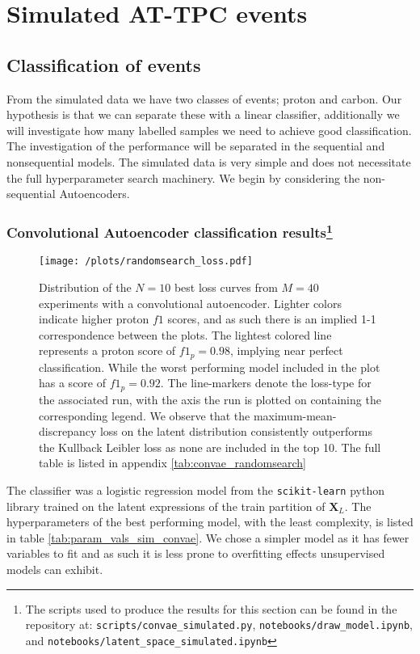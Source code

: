 \section{Simulated AT-TPC events}


\subsection{Classification of events} 
From the simulated data we have two classes of events; proton and carbon. Our hypothesis is that we can separate these with a linear classifier, additionally we will investigate how many labelled samples we need to achieve good classification. The investigation of the performance will be separated in the sequential and non\-sequential models. The simulated data is very simple and does not necessitate the full hyperparameter search machinery. We begin by considering the non-sequential Autoencoders.

\subsubsection{Convolutional Autoencoder classification results\protect\footnote{The scripts used to produce the results for this section can be found in the repository at: \lstinline{scripts/convae_simulated.py}, \lstinline{notebooks/draw_model.ipynb}, and \lstinline{notebooks/latent_space_simulated.ipynb}}}

\begin{figure}[H]
\centering
\texttt{[image: /plots/randomsearch\_loss.pdf]}
\caption[Randomsearch loss curves for CONV-AE on simulated AT-TPC data]{Distribution of the $N=10$ best loss curves from $M=40$ experiments with a convolutional autoencoder. Lighter colors indicate higher proton $f1$ scores, and as such there is an implied 1-1 correspondence between the plots. The lightest colored line represents a proton score of $f1_p = 0.98$, implying near perfect classification. While the worst performing model included in the plot has a score of $f1_p = 0.92$. The line-markers denote the loss-type for the associated run, with the axis the run is plotted on containing the corresponding legend. We observe that the maximum-mean-discrepancy loss on the latent distribution consistently outperforms the Kullback Leibler loss as none are included in the top 10. The full table is listed in appendix \ref{tab:convae_randomsearch}}\label{fig:sim_clf_loss}
\end{figure}


The classifier was a logistic regression model from the \lstinline{scikit-learn} python library trained on the latent expressions of the train partition of $\mathbf{X}_L$. The hyperparameters of the best performing model, with the least complexity, is listed in table \ref{tab:param_vals_sim_convae}. We chose a simpler model as it has fewer variables to fit and as such it is less prone to overfitting effects unsupervised models can exhibit. 


